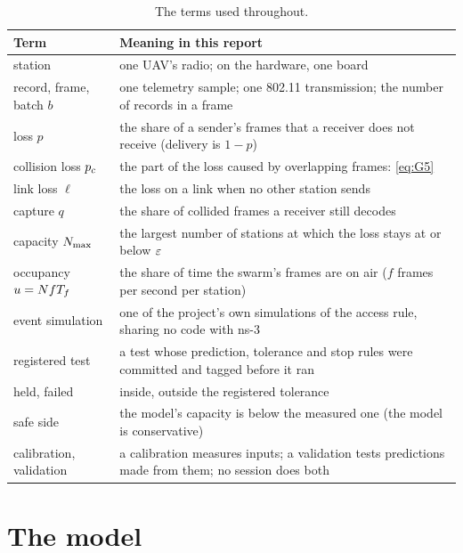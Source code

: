 \documentclass[11pt,a4paper]{article}
\begin{document}
\begin{table}[htbp]
\centering\small
\begin{tabularx}{\textwidth}{>{\raggedright\arraybackslash}p{3.4cm}L}
\toprule
Term & Meaning in this report \\
\midrule
station & one UAV's radio; on the hardware, one board \\
record, frame, batch $b$ & one telemetry sample; one 802.11 transmission; the number of records in a frame \\
loss $p$ & the share of a sender's frames that a receiver does not receive (delivery is $1-p$) \\
collision loss $p_c$ & the part of the loss caused by overlapping frames: \eqref{eq:G5} \\
link loss $\ell$ & the loss on a link when no other station sends \\
capture $q$ & the share of collided frames a receiver still decodes \\
capacity $N_{\max}$ & the largest number of stations at which the loss stays at or below $\varepsilon$ \\
occupancy $u=NfT_f$ & the share of time the swarm's frames are on air ($f$ frames per second per station) \\
event simulation & one of the project's own simulations of the access rule, sharing no code with ns-3 \\
registered test & a test whose prediction, tolerance and stop rules were committed and tagged before it ran \\
held, failed & inside, outside the registered tolerance \\
safe side & the model's capacity is below the measured one (the model is conservative) \\
calibration, validation & a calibration measures inputs; a validation tests predictions made from them; no session does both \\
\bottomrule
\end{tabularx}
\caption{The terms used throughout.}
\label{tab:terms}
\end{table}

\section{The model}\label{sec:model}
\end{document}
